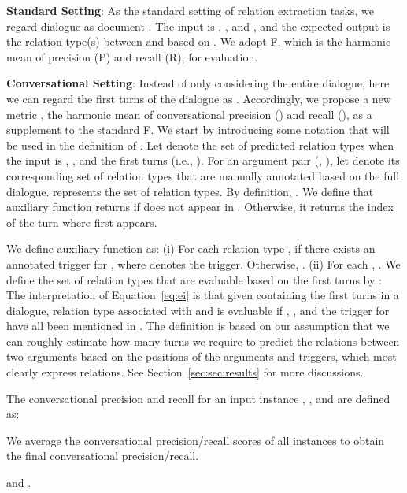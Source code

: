 \documentclass[11pt,a4paper]{article}
\newcommand{\ie}{{i.e.}}
\begin{document}
\medskip

\noindent \textbf{Standard Setting}: As the standard setting of relation extraction tasks, we regard dialogue  as document . The input is , , and , and the expected output is the relation type(s) between  and  based on . We adopt F, which is the harmonic mean of precision (P) and recall (R), for evaluation.

\medskip

\noindent \textbf{Conversational Setting}: 
Instead of only considering the entire dialogue, here we can regard the first  turns of the dialogue as . Accordingly, we propose a new metric , the harmonic mean of conversational precision () and recall (), as a supplement to the standard F. We start by introducing some notation that will be used in the definition of . Let  denote the set of predicted relation types when the input is , , and the first  turns (\ie, ). For an argument pair (, ), let  denote its corresponding set of relation types that are manually annotated based on the full dialogue.  represents the set of  relation types. By definition, . We define that auxiliary function  returns  if  does not appear in . Otherwise, it returns the index of the turn where  first appears. 



We define auxiliary function  as: (i) For each relation type , if there exists an annotated trigger for ,  where  denotes the trigger. Otherwise, . (ii) For each , . We define the set of relation types that are evaluable based on the first  turns by : 
The interpretation of Equation~\ref{eq:ei} is that given  containing the first  turns in a dialogue, relation type  associated with  and  is evaluable if , , and the trigger for  have all been mentioned in . 
The definition is based on our assumption that we can roughly estimate how many turns we require to predict the relations between two arguments based on the positions of the arguments and triggers, which most clearly express relations. See Section~\ref{sec:sec:results} for more discussions.


The conversational precision and recall for an input instance , , and  are defined as:


We average the conversational precision/recall scores of all instances to obtain the final conversational precision/recall.


and . 
\end{document}

